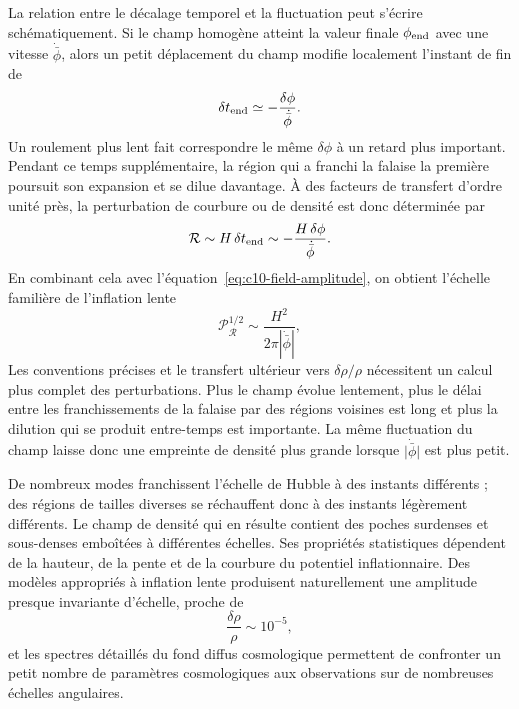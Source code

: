 La relation entre le décalage temporel et la fluctuation peut s’écrire schématiquement. Si le champ homogène atteint la valeur finale \(\phi_{\rm end}\) avec une vitesse \(\dot{\bar\phi}\), alors un petit déplacement du champ modifie localement l’instant de fin de
\begin{equation}
\delta t_{\rm end}
\simeq-\frac{\delta\phi}{\dot{\bar\phi}}.
\label{eq:c10-time-delay}
\end{equation}
Un roulement plus lent fait correspondre le même \(\delta\phi\) à un retard plus important. Pendant ce temps supplémentaire, la région qui a franchi la falaise la première poursuit son expansion et se dilue davantage. À des facteurs de transfert d’ordre unité près, la perturbation de courbure ou de densité est donc déterminée par
\begin{equation}
\mathcal R
\sim H\,\delta t_{\rm end}
\sim-\frac{H\,\delta\phi}{\dot{\bar\phi}}.
\label{eq:c10-curvature-estimate}
\end{equation}
En combinant cela avec l’équation~\eqref{eq:c10-field-amplitude}, on obtient l’échelle familière de l’inflation lente
\begin{equation}
\mathcal P_{\mathcal R}^{1/2}
\sim\frac{H^2}{2\pi|\dot{\bar\phi}|},
\label{eq:c10-slow-roll-amplitude}
\end{equation}
Les conventions précises et le transfert ultérieur vers \(\delta\rho/\rho\) nécessitent un calcul plus complet des perturbations. Plus le champ évolue lentement, plus le délai entre les franchissements de la falaise par des régions voisines est long et plus la dilution qui se produit entre-temps est importante. La même fluctuation du champ laisse donc une empreinte de densité plus grande lorsque \(\lvert\dot{\bar\phi}\rvert\) est plus petit.

De nombreux modes franchissent l’échelle de Hubble à des instants différents ; des régions de tailles diverses se réchauffent donc à des instants légèrement différents. Le champ de densité qui en résulte contient des poches surdenses et sous-denses emboîtées à différentes échelles. Ses propriétés statistiques dépendent de la hauteur, de la pente et de la courbure du potentiel inflationnaire. Des modèles appropriés à inflation lente produisent naturellement une amplitude presque invariante d’échelle, proche de
\[
\frac{\delta\rho}{\rho}\sim10^{-5},
\]
et les spectres détaillés du fond diffus cosmologique permettent de confronter un petit nombre de paramètres cosmologiques aux observations sur de nombreuses échelles angulaires.


